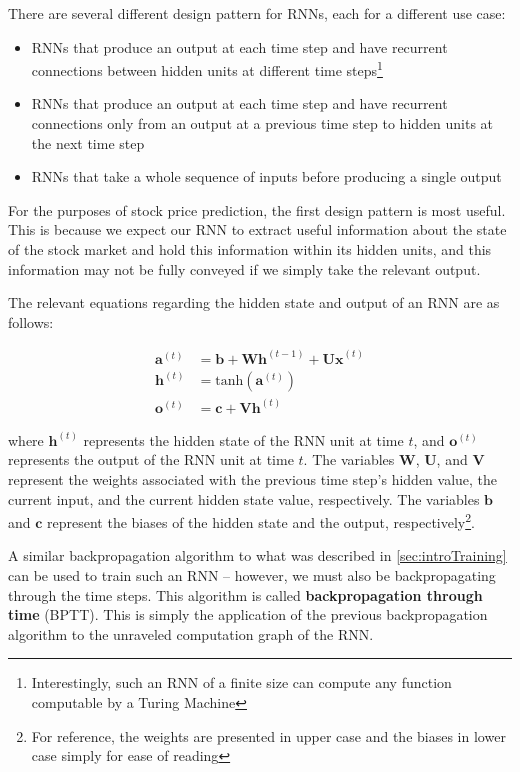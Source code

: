 \documentclass[12pt,a4paper,twoside,openright]{report}
\renewcommand{\vec}[1]{\mathbf{#1}}
\begin{document}
There are several different design pattern for RNNs, each for a different use case:
\begin{itemize}
	\item
	RNNs that produce an output at each time step and have recurrent connections between hidden units
	at different time steps\footnote{Interestingly, such an RNN of a finite size can compute any function computable 
	by a Turing Machine\cite{Goodfellow-et-al-2016}}
	
	\item
	RNNs that produce an output at each time step and have recurrent connections only from an output
	at a previous time step to hidden units at the next time step
	
	\item
	RNNs that take a whole sequence of inputs before producing a single output
\end{itemize}

For the purposes of stock price prediction, the first design pattern is most useful. This is because
we expect our RNN to extract useful information about the state of the stock market and hold this
information within its hidden units, and this information may not be fully conveyed if we simply 
take the relevant output.

The relevant equations regarding the hidden state and output of an RNN are as follows:

\begin{align}
\vec{a}^{(t)} &= \vec{b} + \vec{Wh}^{(t-1)} + \vec{Ux}^{(t)}\\
\vec{h}^{(t)} &= \text{tanh}(\vec{a}^{(t)})\\
\vec{o}^{(t)} &= \vec{c} + \vec{Vh}^{(t)}
\end{align}

where $\vec{h}^(t)$ represents the hidden state of the RNN unit at time $t$,
and $\vec{o}^(t)$ represents the output of the RNN unit at time $t$. The variables
$\vec{W}$, $\vec{U}$, and $\vec{V}$ represent the weights associated with the previous 
time step's hidden value, the current input, and the current hidden state value, respectively.
The variables $\vec{b}$ and $\vec{c}$ represent the biases of the hidden state and the
output, respectively\footnote{For reference, the weights are presented in upper case and the
biases in lower case simply for ease of reading}.

A similar backpropagation algorithm to what was described in \cref{sec:introTraining} can be used
to train such an RNN -- however, we must also be backpropagating through the time steps. This algorithm
is called \textbf{backpropagation through time} (BPTT). This is simply the application of the
previous backpropagation algorithm to the unraveled computation graph of the RNN.
\end{document}
